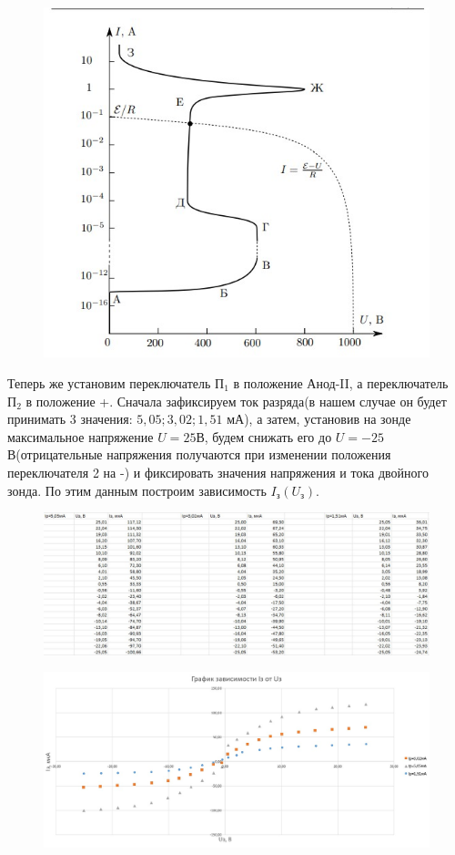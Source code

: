 \documentclass[a4paper,12pt]{article}
\begin{document}
\begin{figure}[H]
	\begin{center}    		
    		\includegraphics[width=.5\textwidth]{priloshenie.jpg}
    	\end{center}
\end{figure}

Теперь же установим переключатель $\text{П}_1$ в положение \glqq Анод-II\grqq, а переключатель $\text{П}_2$ в положение \glqq +\grqq. Сначала зафиксируем ток разряда(в нашем случае он будет принимать 3 значения: $5,05 ;3,02 ; 1,51$ мА), а затем, установив на зонде максимальное напряжение $U = 25$В, будем снижать его до $U = -25$ В(отрицательные напряжения получаются при изменении положения переключателя 2 на \glqq -\grqq) и фиксировать значения напряжения и тока двойного зонда. По этим данным построим зависимость $I_{\text{з}}(U_{\text{з}})$.

\begin{figure}[H]
	\begin{center}
    		\includegraphics[width =1\textwidth]{tabliza2.jpg}
    	\end{center}
\end{figure} 

\begin{figure}[H]
	\begin{center}    		    		\includegraphics[width=1\textwidth]{graphik5.jpg}
    	\end{center}
\end{figure}
\end{document}
